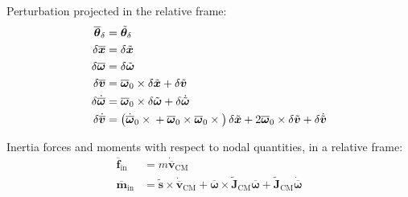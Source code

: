 \documentclass[10pt,dvips,fleqn,subeqn]{report}
\newcommand{\T}[1]{\bm{#1}}
\newcommand{\TT}[1]{\bm{#1}}
\begin{document}
Perturbation projected in the relative frame:
\begin{subequations}
\begin{align}
	\overline{\T{\theta}}_{\delta} &= \tilde{\T{\theta}}_{\delta} \\
	\delta\overline{\T{x}} &= \delta\tilde{\T{x}} \\
	\delta\overline{\T{\omega}} &= \delta\tilde{\T{\omega}} \\
	\delta\overline{\T{v}} &= \overline{\T{\omega}}_0 \times \delta\tilde{\T{x}}
		+ \delta\tilde{\T{v}} \\
	\delta\dot{\overline{\T{\omega}}} &= \overline{\T{\omega}}_0 \times \delta\tilde{\T{\omega}} 
		+ \delta\dot{\tilde{\T{\omega}}} \\
	\delta\dot{\overline{\T{v}}} &= \plbr{
			\dot{\overline{\T{\omega}}}_0 \times{}
			+ \overline{\T{\omega}}_0 \times \overline{\T{\omega}}_0 \times{}
		} \delta\tilde{\T{x}}
		+ 2 \overline{\T{\omega}}_0 \times \delta\tilde{\T{v}}
		+ \delta\dot{\tilde{\T{v}}}
\end{align}
\end{subequations}


Inertia forces and moments with respect to nodal quantities, in a relative frame:
\begin{subequations}
\begin{align}
	\overline{\T{f}}_{\text{in}}
	&= m \dot{\overline{\T{v}}}_{\text{CM}}
	\\
%
	\overline{\T{m}}_{\text{in}}
	&= \tilde{\T{s}}\times \dot{\overline{\T{v}}}_{\text{CM}}
	+ \overline{\T{\omega}} \times \tilde{\TT{J}}_{\text{CM}} \overline{\T{\omega}}
	+ \tilde{\TT{J}}_{\text{CM}} \dot{\overline{\T{\omega}}}
\end{align}
\end{subequations}
\end{document}
